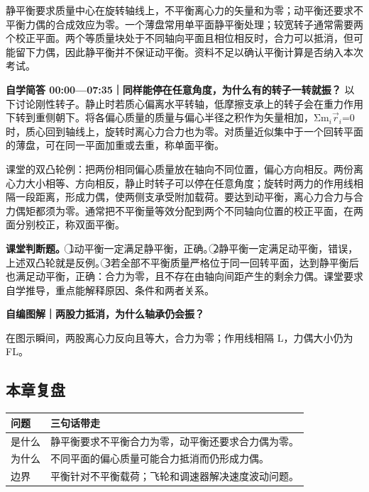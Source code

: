 \documentclass[zihao=5,a4paper,UTF8,fontset=fandol]{ctexart}
\begin{document}
静平衡要求质量中心在旋转轴线上，不平衡离心力的矢量和为零；动平衡还要求不平衡力偶的合成效应为零。一个薄盘常用单平面静平衡处理；较宽转子通常需要两个校正平面。两个等质量块处于不同轴向平面且相位相反时，合力可以抵消，但可能留下力偶，因此静平衡并不保证动平衡。资料不足以确认平衡计算是否纳入本次考试。


\textbf{自学简答 00:00—07:35｜同样能停在任意角度，为什么有的转子一转就振？} 以下讨论刚性转子。静止时若质心偏离水平转轴，低摩擦支承上的转子会在重力作用下转到重侧朝下。将各偏心质量的质量与偏心半径之积作为矢量相加，Σm$_{i}$$\vec{r}_{i}$=0 时，质心回到轴线上，旋转时离心力合力也为零。对质量近似集中于一个回转平面的薄盘，可在同一平面加重或去重，称单面平衡。


课堂的双凸轮例：把两份相同偏心质量放在轴向不同位置，偏心方向相反。两份离心力大小相等、方向相反，静止时转子可以停在任意角度；旋转时两力的作用线相隔一段距离，形成力偶，使两侧支承受附加载荷。要达到动平衡，离心力合力与合力偶矩都须为零。通常把不平衡量等效分配到两个不同轴向位置的校正平面，在两面分别校正，称双面平衡。


\textbf{课堂判断题。} \textcircled{1}动平衡一定满足静平衡，正确。\textcircled{2}静平衡一定满足动平衡，错误，上述双凸轮就是反例。\textcircled{3}若全部不平衡质量严格位于同一回转平面，达到静平衡后也满足动平衡，正确：合力为零，且不存在由轴向间距产生的剩余力偶。课堂要求自学推导，重点能解释原因、条件和两者关系。


\textbf{自编图解｜两股力抵消，为什么轴承仍会振？}


\begin{center}\end{center}


在图示瞬间，两股离心力反向且等大，合力为零；作用线相隔 L，力偶大小仍为 FL。




\subsection{本章复盘}

\begin{longtable}{p{7.51cm}p{7.51cm}}
\toprule
问题 & 三句话带走 \\

\midrule
\endhead
是什么 & 静平衡要求不平衡合力为零，动平衡还要求合力偶为零。 \\
为什么 & 不同平面的偏心质量可能合力抵消而仍形成力偶。 \\
边界 & 平衡针对不平衡载荷；飞轮和调速器解决速度波动问题。 \\
\bottomrule
\end{longtable}
\end{document}
